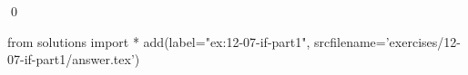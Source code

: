 
\begin{ex}
  \label{ex:12-07-if-part1}
  
  \qed
\end{ex}
\begin{python0}
from solutions import *
add(label="ex:12-07-if-part1",
    srcfilename='exercises/12-07-if-part1/answer.tex')
\end{python0}
